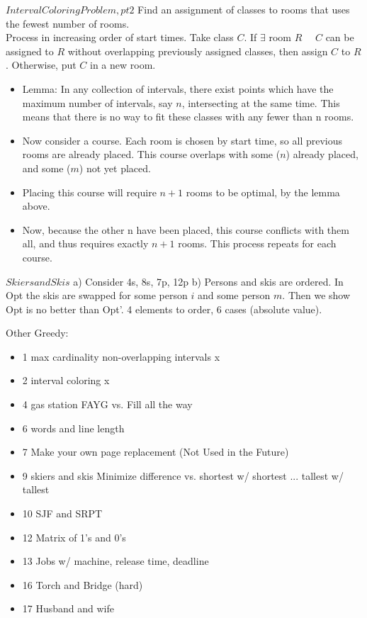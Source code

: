 \documentclass[12pt]{article}
\providecommand{\st}{\ \text{s.t.}\ }
\providecommand{\tightlist}{
    \setlength{\itemsep}{0pt}\setlength{\parskip}{0pt}
}
\begin{document}
$Interval Coloring Problem, pt 2$
Find an assignment of classes to rooms that uses the fewest number of rooms.\\
Process in increasing order of start times. Take class $C$. If $\exists$ room $R$ \st $C$ can be assigned to $R$ without overlapping previously assigned classes, then assign $C$ to $R$. Otherwise, put $C$ in a new room.
\begin{itemize}\tightlist
  \item Lemma: In any collection of intervals, there exist points which have the maximum number of intervals, say $n$, intersecting at the same time. This means that there is no way to fit these classes with any fewer than n rooms.
  \item Now consider a course. Each room is chosen by start time, so all previous rooms are already placed.
	This course overlaps with some ($n$) already placed, and some ($m$) not yet placed.
	\item Placing this course will require $n+1$ rooms to be optimal, by the lemma above.
	\item Now, because the other n have been placed, this course conflicts with them all, and thus requires exactly $n+1$ rooms. This process repeats for each course.
\end{itemize}


$Skiers and Skis$
a) Consider 4s, 8s, 7p, 12p
b) Persons and skis are ordered. In Opt the skis are swapped for some person $i$ and some person $m$. Then we show Opt is no better than Opt'. 4 elements to order, 6 cases (absolute value).



Other Greedy:
\begin{itemize}
  \item 1 max cardinality non-overlapping intervals   x
  \item 2 interval coloring                           x
  \item 4 gas station
          FAYG vs. Fill all the way
  \item 6 words and line length
  \item 7 Make your own page replacement (Not Used in the Future)
  \item 9 skiers and skis
          Minimize difference vs. shortest w/ shortest ... tallest w/ tallest
  \item 10 SJF and SRPT
  \item 12 Matrix of 1's and 0's
  \item 13 Jobs w/ machine, release time, deadline
  \item 16 Torch and Bridge (hard)
  \item 17 Husband and wife
\end{itemize}
\end{document}
